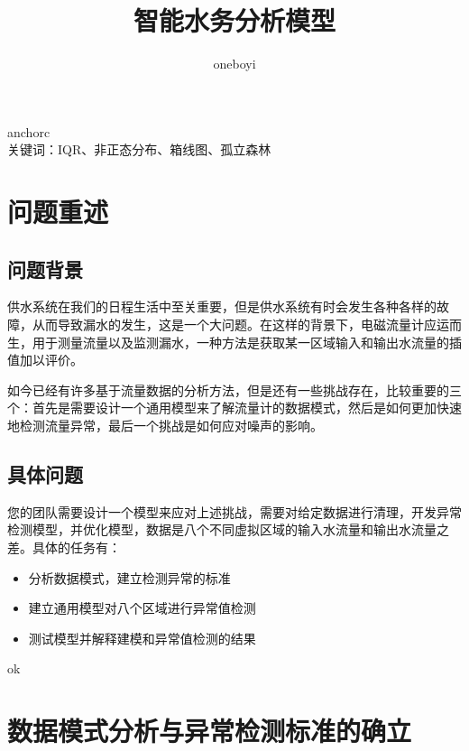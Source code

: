 \documentclass[UTF8]{article}
\begin{document}
	\title{\vspace{+10pt} \heiti \textbf {智能水务分析模型}}
	\songti
	\author{oneboyi}
	\date{}
	\maketitle  
	\section*{}
		\songti anchorc
		\\ \heiti 关键词：\songti IQR、非正态分布、箱线图、孤立森林
		\newpage
	\section{问题重述}
		\subsection{问题背景}
		\par 供水系统在我们的日程生活中至关重要，但是供水系统有时会发生各种各样的故障，从而导致漏水的发生，这是一个大问题。在这样的背景下，电磁流量计应运而生，用于测量流量以及监测漏水，一种方法是获取某一区域输入和输出水流量的插值加以评价。 
		\par 如今已经有许多基于流量数据的分析方法，但是还有一些挑战存在，比较重要的三个：首先是需要设计一个通用模型来了解流量计的数据模式，然后是如何更加快速地检测流量异常，最后一个挑战是如何应对噪声的影响。\cite[C1]{znswxxh}
		\subsection{具体问题}
		\par 您的团队需要设计一个模型来应对上述挑战，需要对给定数据进行清理，开发异常检测模型，并优化模型，数据是八个不同虚拟区域的输入水流量和输出水流量之差。具体的任务有：

		\begin{itemize}
			\item 分析数据模式，建立检测异常的标准
			\item 建立通用模型对八个区域进行异常值检测
			\item 测试模型并解释建模和异常值检测的结果
		\end{itemize}
		ok
	\section{数据模式分析与异常检测标准的确立}	
\end{document}
